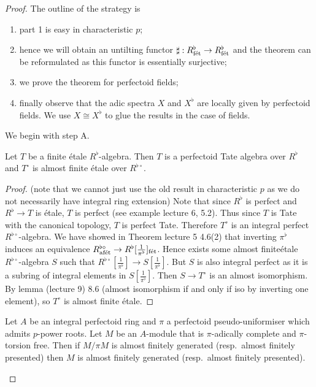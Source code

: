 \documentclass[a4paper]{article}
\newcommand{\tilt}{\flat} %
\begin{document}
\begin{proof}
  The outline of the strategy is
  \begin{enumerate}
  \item part 1 is easy in characteristic \(p\);
  \item hence we will obtain an untilting functor \(\sharp: R^\tilt_{\textup{fét}} \to R^\tilt_{\textup{fét}}\) and the theorem can be reformulated as this functor is essentially surjective;
  \item we prove the theorem for perfectoid fields;
  \item finally observe that the adic spectra \(X\) and \(X^\tilt\) are locally given by perfectoid fields. We use \(X \cong X^\tilt\) to glue the results in the case of fields.
  \end{enumerate}

  We begin with step A.

  \begin{lemma}
    Let \(T\) be a finite étale \(R^\tilt\)-algebra. Then \(T\) is a perfectoid Tate algebra over \(R^\tilt\) and \(T^\circ\) is almost finite étale over \(R^{\tilt \circ}\).
  \end{lemma}

  \begin{proof}
    (note that we cannot just use the old result in characteristic \(p\) as we do not necessarily have integral ring extension) Note that since \(R^\tilt\) is perfect and \(R^\tilt \to T\) is étale, \(T\) is perfect (see example lecture 6, 5.2). Thus since \(T\) is Tate with the canonical topology, \(T\) is perfect Tate. Therefore \(T^\circ\) is an integral perfect \(R^{\tilt \circ}\)-algebra. We have showed in Theorem lecture 5 4.6(2) that inverting \(\pi^\tilt\) induces an equivalence \(R^{\tilt \circ}_{\textup{afét}} \to R^\tilt[\frac{1}{\pi^\tilt}]_{\textup{fét}}\). Hence exists some almost finiteétale \(R^{\tilt \circ}\)-algebra \(S\) such that \(R^{\tilt \circ}[\frac{1}{\pi^\tilt}] \to S[\frac{1}{\pi^\tilt}]\). But \(S\) is also integral perfect as it is a subring of integral elements in \(S[\frac{1}{\pi^\tilt}]\). Then \(S \to T^\circ\) is an almost isomorphism. By lemma (lecture 9) 8.6 (almost isomorphism if and only if iso by inverting one element), so \(T^\circ\) is almost finite étale.
  \end{proof}

  \begin{lemma}
    Let \(A\) be an integral perfectoid ring and \(\pi\) a perfectoid pseudo-uniformiser which admits \(p\)-power roots. Let \(M\) be an \(A\)-module that is \(\pi\)-adically complete and \(\pi\)-torsion free. Then if \(M/\pi M\) is almost finitely generated (resp.\ almost finitely presented) then \(M\) is almost finitely generated (resp.\ almost finitely presented).
  \end{lemma}


\end{proof}
\end{document}

